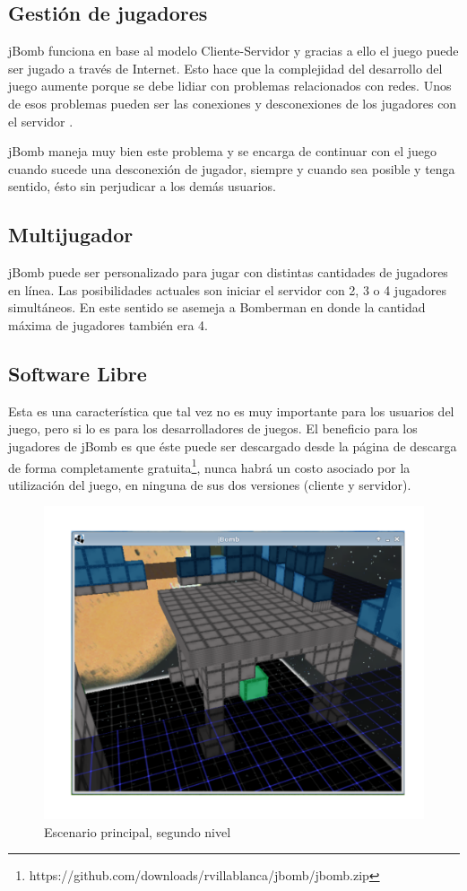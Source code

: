 \documentclass[a4paper,12pt,openany,oneside]{book}
\begin{document}
\subsection{Gestión de jugadores}
jBomb funciona en base al modelo Cliente-Servidor y gracias a ello el juego puede ser jugado a través de Internet. Esto hace que la complejidad del desarrollo del juego aumente porque se debe lidiar con problemas relacionados con redes. Unos de esos problemas pueden ser las conexiones y desconexiones de los jugadores con el servidor \cite{VALVE1}.

jBomb maneja muy bien este problema y se encarga de continuar con el juego cuando sucede una desconexión de jugador, siempre y cuando sea posible y tenga sentido, ésto sin perjudicar a los demás usuarios.
\subsection{Multijugador} 
jBomb puede ser personalizado para jugar con distintas cantidades de jugadores en línea. Las posibilidades actuales son iniciar el servidor con 2, 3 o 4 jugadores simultáneos. En este sentido se asemeja a Bomberman en donde la cantidad máxima de jugadores también era 4.
\subsection{Software Libre}
Esta es una característica que tal vez no es muy importante para los usuarios del juego, pero si lo es para los desarrolladores de juegos.
El beneficio para los jugadores de jBomb es que éste puede ser descargado desde la página de descarga de forma completamente gratuita\footnote{https://github.com/downloads/rvillablanca/jbomb/jbomb.zip}, nunca habrá un costo asociado por la utilización del juego, en ninguna de sus dos versiones (cliente y servidor).

\begin{figure}
\begin{center}
\includegraphics[scale=.7]{img3.pdf}
\end{center}
\caption[Escenario principal, segundo nivel]{Escenario principal, segundo nivel}
\end{figure}
\end{document}
